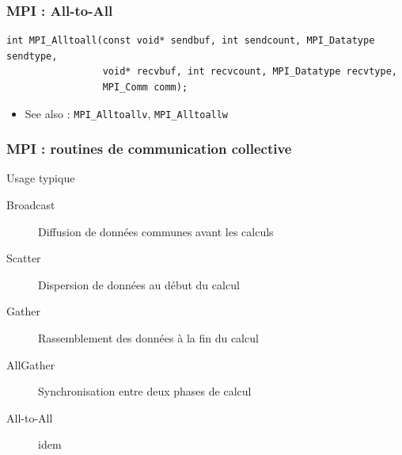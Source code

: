 \documentclass[xcolor={x11names,svgnames}]{beamer}
\begin{document}
\begin{frame}[fragile]
\frametitle{MPI : All-to-All}

\begin{verbatim}
int MPI_Alltoall(const void* sendbuf, int sendcount, MPI_Datatype sendtype,
                 void* recvbuf, int recvcount, MPI_Datatype recvtype,
                 MPI_Comm comm);
\end{verbatim}
               
\bigskip

\begin{center}
\end{center}

\begin{itemize}
\item See also : \texttt{MPI_Alltoallv}, \texttt{MPI_Alltoallw}
\end{itemize}

\end{frame}


\begin{frame}
\frametitle{MPI : routines de communication collective}

\begin{block}{Usage typique}
  \begin{description}
  \item[Broadcast] Diffusion de données communes avant les calculs
  \item[Scatter] Dispersion de données au début du calcul
  \item[Gather] Rassemblement des données à la fin du calcul
  \item[AllGather] Synchronisation entre deux phases de calcul
  \item[All-to-All] idem
  \end{description}
\end{block}
\end{frame}
\end{document}
